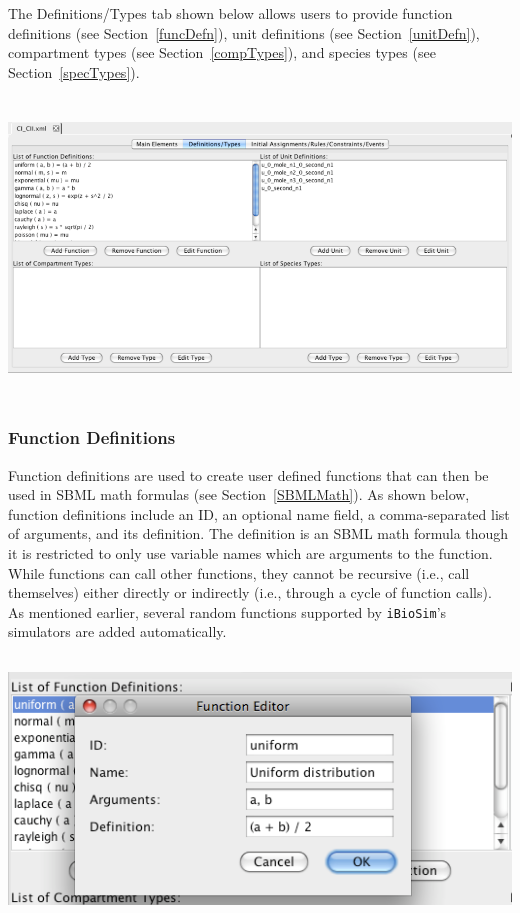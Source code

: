 \documentclass[titlepage,11pt]{article}
\begin{document}
\noindent
The Definitions/Types tab shown below allows users to provide 
function definitions (see Section~\ref{funcDefn}), 
unit definitions (see Section~\ref{unitDefn}), 
compartment types (see Section~\ref{compTypes}), and
species types (see Section~\ref{specTypes}).
\begin{center}
\includegraphics[height=80mm]{screenshots/DefnTypes}
\end{center}

\subsubsection{\label{funcDefn}Function Definitions}

\noindent
Function definitions are used to create user defined functions that
can then be used in SBML math formulas (see Section~\ref{SBMLMath}).  
As shown below, function definitions include an ID, an optional name field, a 
comma-separated list of arguments, and its definition.  The definition 
is an SBML math formula though it is restricted to only use variable 
names which are arguments to the function.  While functions can
call other functions, they cannot be recursive (i.e., call themselves) 
either directly or indirectly (i.e., through a cycle of function calls).
As mentioned earlier, several random functions supported by 
{\tt iBioSim}'s simulators are added automatically.
\begin{center}
\includegraphics[height=70mm]{screenshots/function}
\end{center}
\end{document}
